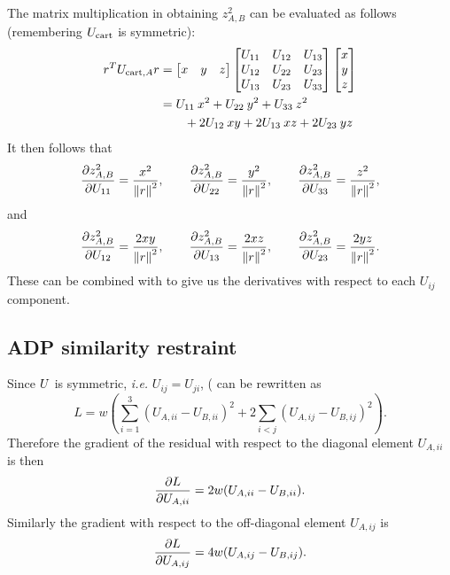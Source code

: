 \documentclass[pdf]{iucr}
\begin{document}
The matrix multiplication in obtaining $z^2_{A,B}$ can be evaluated as follows
(remembering $U_{\text{cart}}$ is symmetric):
\begin{align}
r^TU_{\text{cart},A}r &= 
\begin{bmatrix} x & y & z \end{bmatrix}
\begin{bmatrix} U_{11} & U_{12} & U_{13}\\
  U_{12} & U_{22} & U_{23}\\
  U_{13} & U_{23} & U_{33}\end{bmatrix}
\begin{bmatrix} x\\y\\z\end{bmatrix}\\
&= U_{11}\: x^2 + U_{22}\: y^2 + U_{33}\: z^2 \nonumber \\
&\qquad  + 2U_{12}\: xy + 2U_{13}\: xz + 2U_{23}\: yz
\end{align}
It then follows that
\begin{equation}
\frac{\partial z^2_{A,B}}{\partial U_{11}} = \frac{x^2}{\left\| r \right\|^2} ,\qquad
\frac{\partial z^2_{A,B}}{\partial U_{22}} = \frac{y^2}{\left\| r \right\|^2} ,\qquad
\frac{\partial z^2_{A,B}}{\partial U_{33}} = \frac{z^2}{\left\| r \right\|^2} ,
\end{equation}
and
\begin{equation}
\frac{\partial z^2_{A,B}}{\partial U_{12}} = \frac{2xy}{\left\| r \right\|^2} ,\qquad
\frac{\partial z^2_{A,B}}{\partial U_{13}} = \frac{2xz}{\left\| r \right\|^2} ,\qquad
\frac{\partial z^2_{A,B}}{\partial U_{23}} = \frac{2yz}{\left\| r \right\|^2} .
\end{equation}
These can be combined with  to give us the derivatives
with respect to each $U_{ij}$ component.


\subsection{ADP similarity restraint}

Since $U$ is symmetric, \emph{i.e.} $U_{ij} = U_{ji}$, ( can be rewritten as
\begin{equation}
L = w \left( \sum_{i=1}^3 (U_{A,ii} - U_{B,ii})^2 + 2 \sum_{i < j} (U_{A,ij} - U_{B,ij})^2 \right) .
\end{equation}
Therefore the gradient of the residual with respect to the diagonal element $U_{A,ii}$ is then
\begin{equation}
\frac{\partial L}{\partial U_{A,ii}} = 2w(U_{A,ii} - U_{B,ii}).
\end{equation}
Similarly the gradient with respect to the off-diagonal element $U_{A,ij}$ is
\begin{equation}
\frac{\partial L}{\partial U_{A,ij}} = 4w(U_{A,ij} - U_{B,ij}).
\end{equation}
\end{document}
